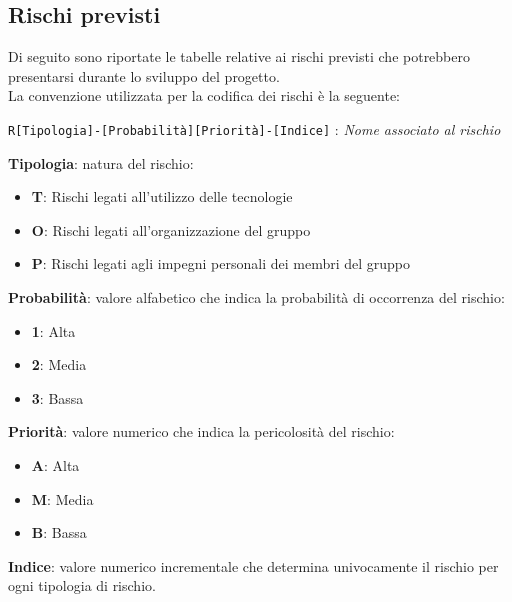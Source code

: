 \documentclass{article}
\begin{document}
\subsection{Rischi previsti}
Di seguito sono riportate le tabelle relative ai rischi previsti che potrebbero presentarsi durante lo sviluppo del progetto. \\
La convenzione utilizzata per la codifica dei rischi è la seguente: 
\begin{center}
    \texttt{R[Tipologia]-[Probabilità][Priorità]-[Indice]} : \textit{Nome associato al rischio}
\end{center} 

\begin{flushleft}
    \textbf{Tipologia}: natura del rischio:
    \begin{itemize}
        \item \textbf{T}: Rischi legati all'utilizzo delle tecnologie
        \item \textbf{O}: Rischi legati all'organizzazione del gruppo
        \item \textbf{P}: Rischi legati agli impegni personali dei membri del gruppo
    \end{itemize}
    \textbf{Probabilità}: valore alfabetico che indica la probabilità di occorrenza del rischio:
    \begin{itemize}
        \item \textbf{1}: Alta
        \item \textbf{2}: Media
        \item \textbf{3}: Bassa
    \end{itemize}
    \textbf{Priorità}: valore numerico che indica la pericolosità del rischio:
    \begin{itemize}
        \item \textbf{A}: Alta
        \item \textbf{M}: Media
        \item \textbf{B}: Bassa
    \end{itemize}
    \textbf{Indice}: valore numerico incrementale che determina univocamente il rischio per ogni tipologia di rischio. 
\end{flushleft}


\newpage
\end{document}
